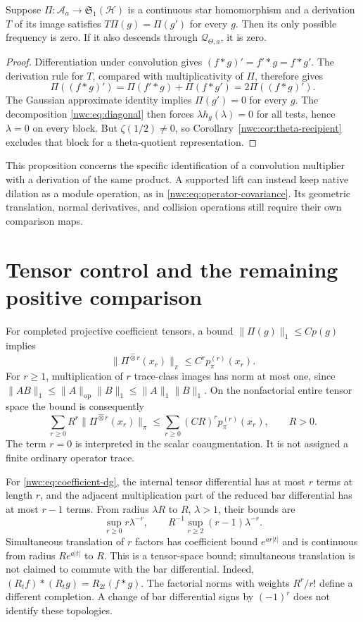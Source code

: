 \begin{proposition}\label{nwc:prop:derivation-distinction}
Suppose $\Pi:\mathcal A_a\to\mathfrak S_1(\mathcal H)$ is a
continuous star homomorphism and a derivation $T$ of its image
satisfies $T\Pi(g)=\Pi(g')$ for every $g$.
Then its only possible frequency is zero.
If it also descends through $\mathcal Q_{\Theta,a}$, it is zero.
\end{proposition}
\begin{proof}
Differentiation under convolution gives
$(f*g)'=f'*g=f*g'$.
The derivation rule for $T$, compared with multiplicativity of $\Pi$,
therefore gives
\[
 \Pi((f*g)')=\Pi(f'*g)+\Pi(f*g')=2\Pi((f*g)').
\]
The Gaussian approximate identity implies $\Pi(g')=0$ for every $g$.
The decomposition \eqref{nwc:eq:diagonal} then forces
$\lambda h_g(\lambda)=0$ for all tests, hence $\lambda=0$ on every
block. But $\zeta(1/2)\ne0$, so Corollary~\ref{nwc:cor:theta-recipient}
excludes that block for a theta-quotient representation.
\end{proof}

This proposition concerns the specific identification of a convolution
multiplier with a derivation of the same product. A supported lift
can instead keep native dilation as a module operation, as in
\eqref{nwc:eq:operator-covariance}. Its geometric translation,
normal derivatives, and collision operations still require their
own comparison maps.

\section{Tensor control and the remaining positive comparison}

For completed projective coefficient tensors, a bound
$\|\Pi(g)\|_1\leq Cp(g)$ implies
\[
 \|\Pi^{\widehat\otimes r}(x_r)\|_\pi
       \leq C^r p_\pi^{(r)}(x_r).
\]
For $r\geq1$, multiplication of $r$ trace-class images has norm
at most one, since
$\|AB\|_1\leq\|A\|_{\mathrm{op}}\|B\|_1\leq\|A\|_1\|B\|_1$.
On the nonfactorial entire tensor space the bound is consequently
\begin{equation}\label{nwc:eq:entire-bound}
 \sum_{r\geq0}R^r\|\Pi^{\widehat\otimes r}(x_r)\|_\pi
 \leq\sum_{r\geq0}(CR)^r p_\pi^{(r)}(x_r),\qquad R>0.
\end{equation}
The term $r=0$ is interpreted in the scalar coaugmentation.
It is not assigned a finite ordinary operator trace.

For \eqref{nwc:eq:coefficient-dg}, the internal tensor differential
has at most $r$ terms at length $r$, and the adjacent multiplication
part of the reduced bar differential has at most $r-1$ terms.
From radius $\lambda R$ to $R$, $\lambda>1$, their bounds are
\[
 \sup_{r\geq0}r\lambda^{-r},\qquad
 R^{-1}\sup_{r\geq2}(r-1)\lambda^{-r}.
\]
Simultaneous translation of $r$ factors has coefficient bound
$e^{ar|t|}$ and is continuous from radius $Re^{a|t|}$ to $R$.
This is a tensor-space bound; simultaneous translation is not claimed
to commute with the bar differential. Indeed,
$(R_tf)*(R_tg)=R_{2t}(f*g)$.
The factorial norms with weights $R^r/r!$ define a different
completion. A change of bar differential signs by $(-1)^r$ does
not identify these topologies.


